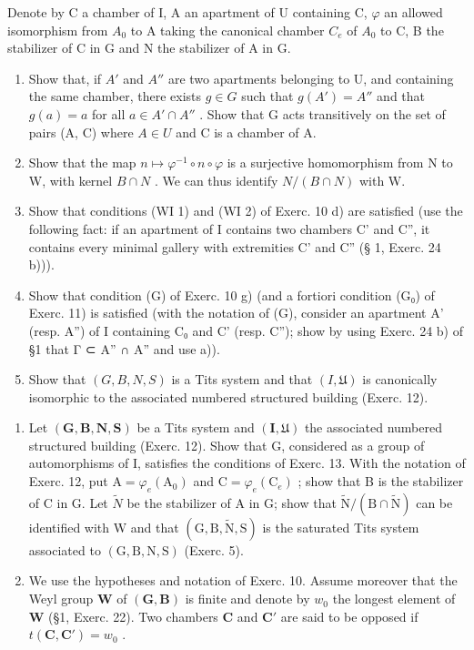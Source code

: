 Denote by C a chamber of I, A an apartment of U containing C, \(\varphi\) an allowed isomorphism from \(A_{0}\) to A taking the canonical chamber \(C_{e}\) of \(A_{0}\) to C, B the stabilizer of C in G and N the stabilizer of A in G.

\begin{enumerate}
\def\labelenumi{\alph{enumi})}
\item
  Show that, if \(A'\) and \(A''\) are two apartments belonging to U, and containing the same chamber, there exists \(g \in G\) such that \(g(A') = A''\) and that \(g(a) = a\) for all \(a \in A' \cap A''\) . Show that G acts transitively on the set of pairs (A, C) where \(A \in U\) and C is a chamber of A.
\item
  Show that the map \(n \mapsto \varphi^{-1} \circ n \circ \varphi\) is a surjective homomorphism from N to W, with kernel \(B \cap N\) . We can thus identify \(N/(B \cap N)\) with W.
\item
  Show that conditions (WI 1) and (WI 2) of Exerc. 10 d) are satisfied (use the following fact: if an apartment of I contains two chambers C' and C'', it contains every minimal gallery with extremities C' and C'' (§ 1, Exerc. 24 b))).
\item
  Show that condition (G) of Exerc. 10 g) (and a fortiori condition (G₀) of Exerc. 11) is satisfied (with the notation of (G), consider an apartment A' (resp. A'') of I containing C₀ and C' (resp. C''); show by using Exerc. 24 b) of §1 that Γ ⊂ A'' ∩ A'' and use a)).
\item
  Show that \((G, B, N, S)\) is a Tits system and that \((I, \mathfrak{U})\) is canonically isomorphic to the associated numbered structured building (Exerc. 12).
\end{enumerate}

\begin{enumerate}
\def\labelenumi{\arabic{enumi})}
\setcounter{enumi}{13}
\item
  Let \((\mathbf{G},\mathbf{B},\mathbf{N},\mathbf{S})\) be a Tits system and \((\mathbf{I},\mathfrak{U})\) the associated numbered structured building (Exerc. 12). Show that G, considered as a group of automorphisms of I, satisfies the conditions of Exerc. 13. With the notation of Exerc. 12, put \(\mathrm{A}=\varphi_{e}(\mathrm{A}_{0})\) and \(\mathrm{C}=\varphi_{e}(\mathrm{C}_{e})\) ; show that B is the stabilizer of C in G. Let \(\tilde{N}\) be the stabilizer of A in G; show that \(\tilde{\mathrm{N}}/(\mathrm{B}\cap\tilde{\mathrm{N}})\) can be identified with W and that \((\mathrm{G},\mathrm{B},\tilde{\mathrm{N}},\mathrm{S})\) is the saturated Tits system associated to \((\mathrm{G},\mathrm{B},\mathrm{N},\mathrm{S})\) (Exerc. 5).
\item
  We use the hypotheses and notation of Exerc. 10. Assume moreover that the Weyl group \(\mathbf{W}\) of \((\mathbf{G},\mathbf{B})\) is finite and denote by \(w_0\) the longest element of \(\mathbf{W}\) (§1, Exerc. 22). Two chambers \(\mathbf{C}\) and \(\mathbf{C}'\) are said to be opposed if \(t(\mathbf{C},\mathbf{C}') = w_0\) .
\end{enumerate}

